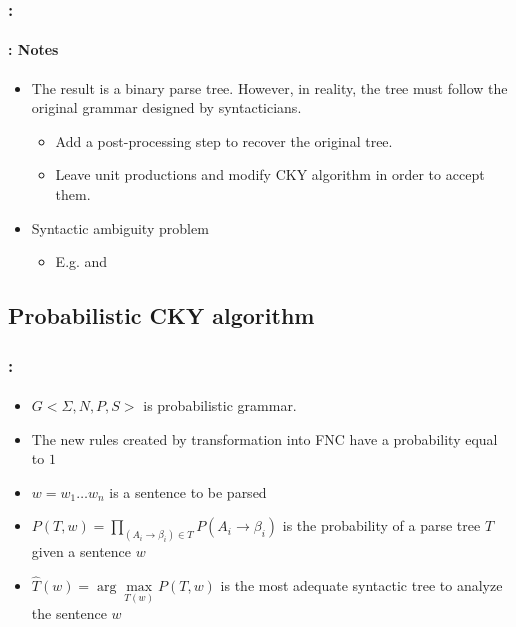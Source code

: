 \documentclass[xcolor=table]{beamer}
\begin{document}
\begin{frame}
	\frametitle{\insertshortsubtitle: \insertsection}
	\framesubtitle{\insertsubsection: Notes}

	\begin{minipage}{.53\textwidth}
	\begin{itemize}
		\item The result is a binary parse tree. 
		However, in reality, the tree must follow the original grammar designed by syntacticians.
		\begin{itemize}
			\item Add a post-processing step to recover the original tree.
			\item Leave unit productions and modify CKY algorithm in order to accept them.
		\end{itemize}
		\item Syntactic ambiguity problem
		\begin{itemize}
			\item E.g.  and 
		\end{itemize}
	\end{itemize}
	\end{minipage}
	\begin{minipage}{.45\textwidth}
	\end{minipage}

\end{frame}

\subsection{Probabilistic CKY algorithm}

\begin{frame}
	\frametitle{\insertshortsubtitle: \insertsection}
	\framesubtitle{\insertsubsection}

	\begin{itemize}
		\item $G<\Sigma, N, P, S>$ is probabilistic grammar.
		\item The new rules created by transformation into FNC have a probability equal to $1$
		\item $w = w_1 \ldots w_n$ is a sentence to be parsed
		\item $P(T, w) = \prod\limits_{(A_i \rightarrow \beta_i) \in T} P(A_i \rightarrow \beta_i)$ is the probability of a parse tree $T$ given a sentence $w$
		\item $\hat{T}(w) = \arg\max\limits_{T(w)} P(T, w) $ is the most adequate syntactic tree to analyze the sentence $w$
	\end{itemize}

\end{frame}
\end{document}
